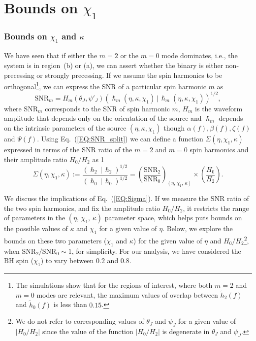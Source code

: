 
\chapter{Bounds on $\chi_1$}

\subsection{Bounds on $\chi_1$ and $\kappa$}

We have seen that if either the $m=2$ or the $m=0$ mode dominates, i.e., the
system is in region~(b) or (a), we can assert whether the binary is either
non-precessing or strongly precessing. If we assume the spin harmonics to be
orthogonal\footnote{The simulations show that for the regions of interest,
where both $m=2$ and $m=0$ modes are relevant, the maximum values of overlap
between $\tilde h_2(f)$ and $\tilde h_0(f)$ is less than $0.15$.}, we can
express the SNR of a particular spin harmonic $m$ as
\begin{equation}
\text{SNR}_{m} = H_{m} (\theta_{J}, \psi'_J) (\hslash_{m}(\eta,
\kappa,\chi_1)\,|\,\hslash_{m}(\eta, \kappa,\chi_1))^{1/2},
\label{EQ:SNR_split}
\end{equation}
where $\text{SNR}_{m}$ corresponds to the SNR of spin harmonic $m$, $H_{m}$ is
the waveform amplitude that depends only on the orientation of the source and
$\hslash_{m}$ depends on the intrinsic parameters of the source $(\eta,
\kappa,\chi_1)$ though $\alpha(f), \beta(f), \zeta(f)$ and $\Psi(f)$. Using
Eq.~(\ref{EQ:SNR_split}) we can define a function $\Sigma(\eta, \chi_1,
\kappa)$ expressed in terms of the SNR ratio of the $m=2$ and $m=0$ spin
harmonics and their amplitude ratio $H_{0}/H_{2}$ as
1
\begin{equation}
\Sigma(\eta, \chi_1, \kappa):=\frac{(\hslash_{2}\,|\,\hslash_{2})^{1/2}}{(\hslash_{0}\,|\,\hslash_{0})^{1/2}} =
\left(\frac{\text{SNR}_{2}}{\text{SNR}_{0}}\right)_{(\eta,\,\chi_1,
\,\kappa)} \times \left(\frac{H_{0}}{H_{2}}\right).
\label{EQ:Sigma}
\end{equation}

We discuss the implications of Eq.~(\ref{EQ:Sigma}). If we measure the SNR
ratio of the two spin harmonics, and fix the amplitude ratio $H_0/H_2$, it
restricts the range of parameters in the $(\eta,\,\chi_1,\,\kappa)$ parameter
space, which helps puts bounds on the possible values of $\kappa$ and $\chi_1$
for a given value of $\eta$. Below, we explore the bounds on these two
parameters ($\chi_1$ and $\kappa$) for the given value of $\eta$ and
$H_0/H_2$\footnote{We do not refer to corresponding values of $\theta_J$ and
$\psi_J$ for a given value of $|H_0/H_2|$ since the value of the function
$|H_0/H_2|$ is degenerate in $\theta_J$ and $\psi_J$.}, when
$\text{SNR}_2/\text{SNR}_0 \sim 1$, for simplicity. For our analysis, we have
considered the BH spin ($\chi_1$) to vary between $0.2$ and $0.8$.

